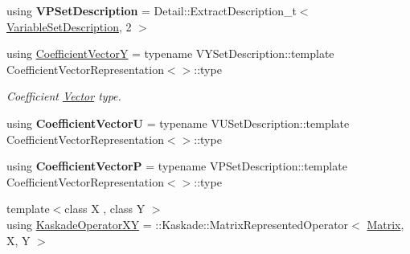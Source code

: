 \begin{DoxyCompactItemize}
\item 
\hypertarget{classSpacy_1_1KaskadeParabolic_1_1C2Functional_a1bd8d286b285d74be7787e1efaa47920}{using {\bfseries V\-P\-Set\-Description} = Detail\-::\-Extract\-Description\-\_\-t$<$ \hyperlink{classSpacy_1_1KaskadeParabolic_1_1C2Functional_a234ab8fa6f10a5828fd7e26af1897aa6}{Variable\-Set\-Description}, 2 $>$}\label{classSpacy_1_1KaskadeParabolic_1_1C2Functional_a1bd8d286b285d74be7787e1efaa47920}

\item 
\hypertarget{classSpacy_1_1KaskadeParabolic_1_1C2Functional_a9acc899e953d1de9611a01b0cb1fdb6f}{using \hyperlink{classSpacy_1_1KaskadeParabolic_1_1C2Functional_a9acc899e953d1de9611a01b0cb1fdb6f}{Coefficient\-Vector\-Y} = typename V\-Y\-Set\-Description\-::template Coefficient\-Vector\-Representation$<$$>$\-::type}\label{classSpacy_1_1KaskadeParabolic_1_1C2Functional_a9acc899e953d1de9611a01b0cb1fdb6f}

\begin{DoxyCompactList}\small\item\em Coefficient \hyperlink{classSpacy_1_1KaskadeParabolic_1_1Vector}{Vector} type. \end{DoxyCompactList}\item 
\hypertarget{classSpacy_1_1KaskadeParabolic_1_1C2Functional_af3047c8b144bf7adfef2b63b7844dbbd}{using {\bfseries Coefficient\-Vector\-U} = typename V\-U\-Set\-Description\-::template Coefficient\-Vector\-Representation$<$$>$\-::type}\label{classSpacy_1_1KaskadeParabolic_1_1C2Functional_af3047c8b144bf7adfef2b63b7844dbbd}

\item 
\hypertarget{classSpacy_1_1KaskadeParabolic_1_1C2Functional_a029093a11509fcc1790be7ad5e1145ff}{using {\bfseries Coefficient\-Vector\-P} = typename V\-P\-Set\-Description\-::template Coefficient\-Vector\-Representation$<$$>$\-::type}\label{classSpacy_1_1KaskadeParabolic_1_1C2Functional_a029093a11509fcc1790be7ad5e1145ff}

\item 
\hypertarget{classSpacy_1_1KaskadeParabolic_1_1C2Functional_ae632f4bc512edd363e605fedd8e8c230}{{\footnotesize template$<$class X , class Y $>$ }\\using \hyperlink{classSpacy_1_1KaskadeParabolic_1_1C2Functional_ae632f4bc512edd363e605fedd8e8c230}{Kaskade\-Operator\-X\-Y} = \-::Kaskade\-::\-Matrix\-Represented\-Operator$<$ \hyperlink{classSpacy_1_1KaskadeParabolic_1_1C2Functional_a6b9f4dcd6b15dbcb5fce503fbd957adc}{Matrix}, X, Y $>$}\label{classSpacy_1_1KaskadeParabolic_1_1C2Functional_ae632f4bc512edd363e605fedd8e8c230}


\end{DoxyCompactItemize}
